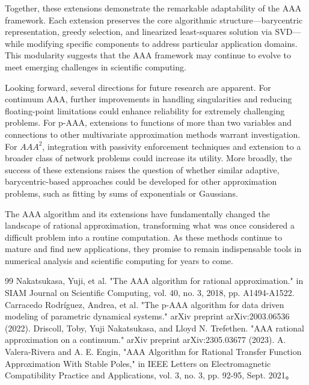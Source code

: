 \documentclass{article}
\begin{document}
Together, these extensions demonstrate the remarkable adaptability of the AAA framework. Each extension preserves the core algorithmic structure—barycentric representation, greedy selection, and linearized least-squares solution via SVD—while modifying specific components to address particular application domains. This modularity suggests that the AAA framework may continue to evolve to meet emerging challenges in scientific computing.

Looking forward, several directions for future research are apparent. For continuum AAA, further improvements in handling singularities and reducing floating-point limitations could enhance reliability for extremely challenging problems. For p-AAA, extensions to functions of more than two variables and connections to other multivariate approximation methods warrant investigation. For $AAA^{2}$, integration with passivity enforcement techniques and extension to a broader class of network problems could increase its utility. More broadly, the success of these extensions raises the question of whether similar adaptive, barycentric-based approaches could be developed for other approximation problems, such as fitting by sums of exponentials or Gaussians.

The AAA algorithm and its extensions have fundamentally changed the landscape of rational approximation, transforming what was once considered a difficult problem into a routine computation. As these methods continue to mature and find new applications, they promise to remain indispensable tools in numerical analysis and scientific computing for years to come.

\begin{thebibliography}{99}
 Nakatsukasa, Yuji, et al. "The AAA algorithm for rational approximation." in SIAM Journal on Scientific Computing, vol. 40, no. 3, 2018, pp. A1494-A1522.
 Carracedo Rodríguez, Andrea, et al. "The p-AAA algorithm for data driven modeling of parametric dynamical systems." arXiv preprint arXiv:2003.06536 (2022).
 Driscoll, Toby, Yuji Nakatsukasa, and Lloyd N. Trefethen. "AAA rational approximation on a continuum." arXiv preprint arXiv:2305.03677 (2023).
 A. Valera-Rivera and A. E. Engin, "AAA Algorithm for Rational Transfer Function Approximation With Stable Poles," in IEEE Letters on Electromagnetic Compatibility Practice and Applications, vol. 3, no. 3, pp. 92-95, Sept. 2021。

\end{thebibliography}
\end{document}
